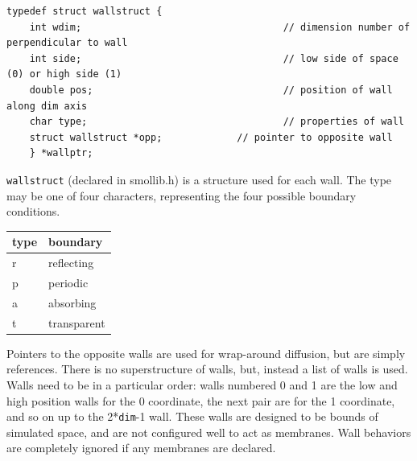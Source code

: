 \documentclass {scrbook}
\newcommand {\ttt} {\texttt}
\begin{document}
\begin{lstlisting}
typedef struct wallstruct {
	int wdim;									// dimension number of perpendicular to wall
	int side;									// low side of space (0) or high side (1)
	double pos;									// position of wall along dim axis
	char type;									// properties of wall
	struct wallstruct *opp; 			// pointer to opposite wall
	} *wallptr;
\end{lstlisting}

\ttt{wallstruct} (declared in smollib.h) is a structure used for each wall. The type may be one of four characters, representing the four possible boundary conditions.

\begin{longtable}[c]{ll}
type & boundary\\
\hline
r & reflecting\\
p & periodic\\
a & absorbing\\
t & transparent\\
\end{longtable}

Pointers to the opposite walls are used for wrap-around diffusion, but are simply references. There is no superstructure of walls, but, instead a list of walls is used. Walls need to be in a particular order: walls numbered 0 and 1 are the low and high position walls for the 0 coordinate, the next pair are for the 1 coordinate, and so on up to the 2*\ttt{dim}-1 wall. These walls are designed to be bounds of simulated space, and are not configured well to act as membranes. Wall behaviors are completely ignored if any membranes are declared.
\end{document}
